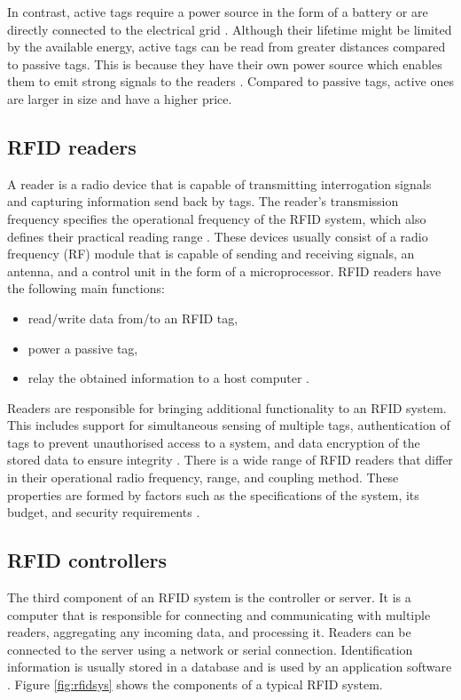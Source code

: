 In contrast, active tags require a power source in the form of a battery or are directly connected to the electrical grid \cite{Want2006}. Although their lifetime might be limited by the available energy, active tags can be read from greater distances compared to passive tags. This is because they have their own power source which enables them to emit strong signals to the readers \cite{Weinstein2005}. Compared to passive tags, active ones are larger in size and have a higher price.

\subsection{RFID readers}

A reader is a radio device that is capable of transmitting interrogation signals and capturing information send back by tags. The reader's transmission frequency specifies the operational frequency of the RFID system, which also defines their practical reading range \cite{Finkenzeller2010}. These devices usually consist of a radio frequency (RF) module that is capable of sending and receiving  signals, an antenna, and a control unit in the form of a microprocessor. RFID readers have the following main functions:

\begin{itemize}
	\item read/write data from/to an RFID tag,
	\item power a passive tag,
	\item relay the obtained information to a host computer \cite[p. 9]{Hunt2007}.
\end{itemize}

Readers are responsible for bringing additional functionality to an RFID system. This includes support for simultaneous sensing of multiple tags, authentication of tags to prevent unauthorised access to a system, and data encryption of the stored data to ensure integrity \cite[p. 10]{Hunt2007}. There is a wide range of RFID readers that differ in their operational radio frequency, range, and coupling method. These properties are formed by factors such as the specifications of the system, its budget, and security requirements \cite[p. 25]{Finkenzeller2010}.

\subsection{RFID controllers}

The third component of an RFID system is the controller or server. It is a computer that is responsible for connecting and communicating with multiple readers, aggregating any incoming data, and processing it. Readers can be connected to the server using a network or serial connection. Identification information is usually stored in a database and is used by an application software \cite[p. 11]{Hunt2007}. Figure \ref{fig:rfidsys} shows the components of a typical RFID system.

